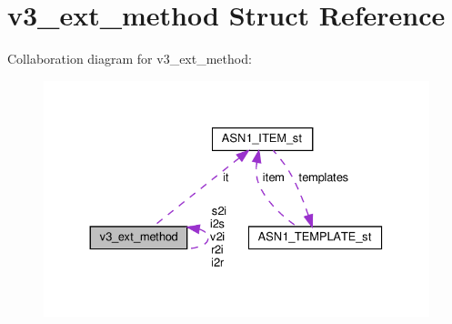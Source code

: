 \hypertarget{structv3__ext__method}{}\section{v3\+\_\+ext\+\_\+method Struct Reference}
\label{structv3__ext__method}


Collaboration diagram for v3\+\_\+ext\+\_\+method\+:
\nopagebreak
\begin{figure}[H]
\begin{center}
\leavevmode
\includegraphics[width=330pt]{structv3__ext__method__coll__graph}
\end{center}
\end{figure}
